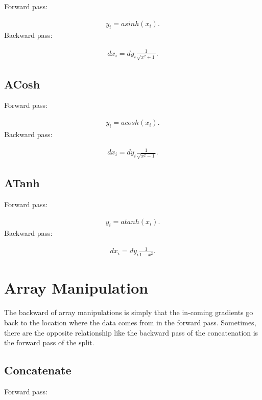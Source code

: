 \documentclass{article}
\begin{document}
Forward pass:

\begin{eqnarray}
  y_i = asinh (x_i).
\end{eqnarray}
%
Backward pass:

\begin{eqnarray}
  dx_i = dy_i \frac{1}{\sqrt{x^2 + 1}}.
\end{eqnarray}


\subsection{ACosh}

Forward pass:

\begin{eqnarray}
  y_i = acosh (x_i).
\end{eqnarray}
%
Backward pass:

\begin{eqnarray}
  dx_i = dy_i \frac{1}{\sqrt{x^2 - 1}}.
\end{eqnarray}

\subsection{ATanh}

Forward pass:

\begin{eqnarray}
  y_i = atanh (x_i).
\end{eqnarray}
%
Backward pass:

\begin{eqnarray}
  dx_i = dy_i \frac{1}{1 - x^2}.
\end{eqnarray}


\section{Array Manipulation}
\label{sec:Array Manipulation}

The backward of array manipulations is simply that the in-coming gradients go back to the location where the data comes from in the forward pass. Sometimes, there are the opposite relationship like the backward pass of the concatenation is the forward pass of the split.

\subsection{Concatenate}

Forward pass:
\end{document}
